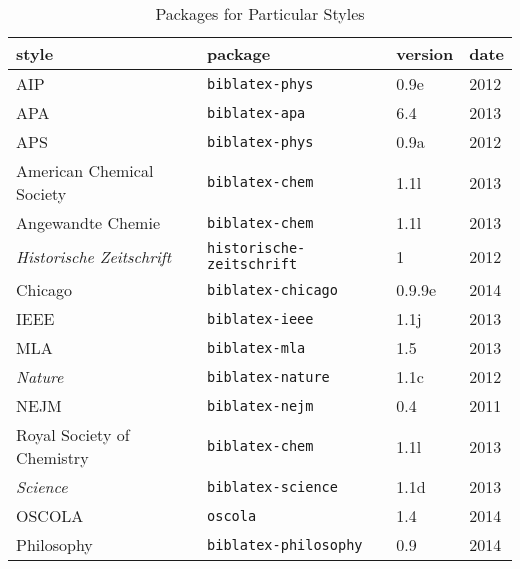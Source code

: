 \begin{table}
\caption{Packages for Particular Styles\label{ctan:bespoke}}
\small
\begin{tabular}{llll}
\toprule
\textsf{style}                   & \textsf{package}                 & \textsf{version} & \textsf{date} \\
\midrule AIP                     & \texttt{biblatex-phys}           & 0.9e             & 2012          \\
APA                              & \texttt{biblatex-apa}            & 6.4              & 2013          \\
APS                              & \texttt{biblatex-phys}           & 0.9a             & 2012          \\
American Chemical Society        & \texttt{biblatex-chem}           & 1.1l             & 
2013                                                                                                   \\
Angewandte Chemie                & \texttt{biblatex-chem}           & 1.1l             & 2013
                                                                                                       \\
\textit{Historische Zeitschrift} & \texttt{historische-zeitschrift} & 1
                                 & 2012                                                                \\
Chicago                          & \texttt{biblatex-chicago}        & 0.9.9e           & 2014          \\
IEEE                             & \texttt{biblatex-ieee}           & 1.1j             & 2013          \\
MLA                              & \texttt{biblatex-mla}            & 1.5              & 2013          \\
\textit{Nature}                  & \texttt{biblatex-nature}         & 1.1c             & 2012          \\
NEJM                             & \texttt{biblatex-nejm}           & 0.4              & 2011          \\
Royal Society of Chemistry       & \texttt{biblatex-chem}           & 1.1l             & 2013          \\
\textit{Science}                 & \texttt{biblatex-science}        & 1.1d             & 2013          \\
OSCOLA                           & \texttt{oscola}                  & 1.4              & 2014          \\
Philosophy                       & \texttt{biblatex-philosophy}     & 0.9              & 2014          \\
\bottomrule
\end{tabular}
\end{table}

